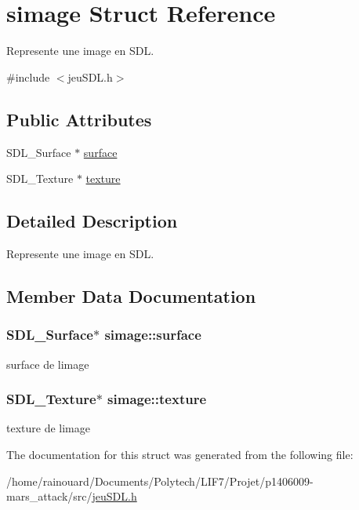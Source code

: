 \hypertarget{structsimage}{}\section{simage Struct Reference}
\label{structsimage}


Represente une image en S\+DL.  




{\ttfamily \#include $<$jeu\+S\+D\+L.\+h$>$}

\subsection*{Public Attributes}
\begin{DoxyCompactItemize}
\item 
S\+D\+L\+\_\+\+Surface $\ast$ \hyperlink{structsimage_ab89b420ea0ffe4647a8b08007de8df73}{surface}
\item 
S\+D\+L\+\_\+\+Texture $\ast$ \hyperlink{structsimage_aa423b13f0a5ea7e9cbf117d90f55e6d0}{texture}
\end{DoxyCompactItemize}


\subsection{Detailed Description}
Represente une image en S\+DL. 

\subsection{Member Data Documentation}
\subsubsection[{\texorpdfstring{surface}{surface}}]{\setlength{\rightskip}{0pt plus 5cm}S\+D\+L\+\_\+\+Surface$\ast$ simage\+::surface}\hypertarget{structsimage_ab89b420ea0ffe4647a8b08007de8df73}{}\label{structsimage_ab89b420ea0ffe4647a8b08007de8df73}
surface de l\textquotesingle{}image 
\subsubsection[{\texorpdfstring{texture}{texture}}]{\setlength{\rightskip}{0pt plus 5cm}S\+D\+L\+\_\+\+Texture$\ast$ simage\+::texture}\hypertarget{structsimage_aa423b13f0a5ea7e9cbf117d90f55e6d0}{}\label{structsimage_aa423b13f0a5ea7e9cbf117d90f55e6d0}
texture de l\textquotesingle{}image 

The documentation for this struct was generated from the following file\+:\begin{DoxyCompactItemize}
\item 
/home/rainouard/\+Documents/\+Polytech/\+L\+I\+F7/\+Projet/p1406009-\/mars\+\_\+attack/src/\hyperlink{jeuSDL_8h}{jeu\+S\+D\+L.\+h}\end{DoxyCompactItemize}

